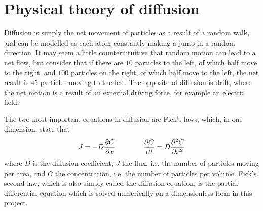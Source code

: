 \section{Physical theory of diffusion}\label{sec:physics}
Diffusion is simply the net movement of particles as a result of a random walk, and can be modelled as each atom constantly making a jump in a random  direction. It may seem a little counterintuitive that random motion can lead to a net flow, but consider that if there are \(10\) particles to the left, of which half move to the right, and \(100\) particles on the right, of which half move to the left, the net result is \(45\) particles moving to the left. The opposite of diffusion is drift, where the net motion is a result of an external driving force, for example an electric field.

The two most important equations in diffusion are Fick's laws, which, in one dimension, state that
\[
J = -D\pdv{C}{x} \qquad \qquad \pdv{C}{t} = D\pdv[2]{C}{x}
\]
where \(D\) is the diffusion coefficient, \(J\) the flux, i.e. the number of particles moving per area, and \(C\) the concentration, i.e. the number of particles per volume. Fick's second law, which is also simply called the diffusion equation, is the partial differential equation which is solved numerically on a dimensionless form in this project.


